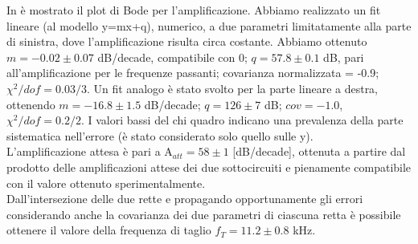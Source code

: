 In  è mostrato il plot di Bode per l'amplificazione. Abbiamo realizzato un fit lineare (al modello y=mx+q), numerico, a due parametri limitatamente alla parte di sinistra, dove l'amplificazione risulta circa costante. Abbiamo ottenuto $m = -0.02 \pm 0.07$ dB/decade, compatibile con 0; $q = 57.8 \pm 0.1$ dB, pari all'amplificazione per le frequenze passanti; covarianza normalizzata = -0.9; $ \chi ^2/dof = 0.03/3$. Un fit analogo è stato svolto per la parte lineare a destra, ottenendo $m = -16.8 \pm 1.5$ dB/decade; $q = 126 \pm 7$ dB; $cov = -1.0$, $ \chi ^2/dof = 0.2/2$. I valori bassi del chi quadro indicano una prevalenza della parte sistematica nell'errore (è stato considerato solo quello sulle y).\\
L'amplificazione attesa è pari a A$_{att} = 58 \pm 1$ [dB/decade], ottenuta a partire dal prodotto delle amplificazioni attese dei due sottocircuiti e pienamente compatibile con il valore ottenuto sperimentalmente.\\
Dall'intersezione delle due rette e propagando opportunamente gli errori considerando anche la covarianza dei due parametri di ciascuna retta è possibile ottenere il valore della frequenza di taglio $f_T = 11.2 \pm 0.8$ kHz.


